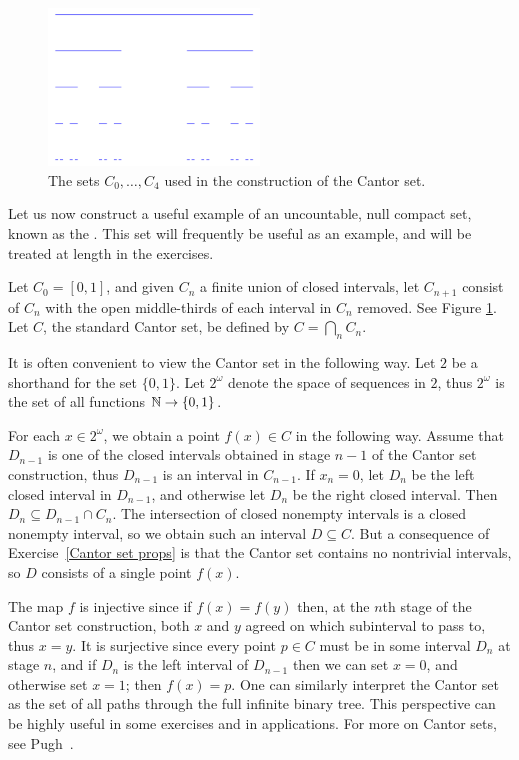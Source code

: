\begin{figure}
\label{Cantor set figure}
\caption{The sets $C_{0}, \dots, C_{4}$ used in the construction of the Cantor set.}
\centering \includegraphics[width=0.5\textwidth]{graphics/CantorSet}
\end{figure}

\begin{subsec}
Let us now construct a useful example of an uncountable, null compact set, known as the .
This set will frequently be useful as an example, and will be treated at length in the exercises.

Let $C_{0} = [0, 1]$, and given $C_{n}$ a finite union of closed intervals, let $C_{n+1}$ consist of $C_{n}$ with the open middle-thirds of each interval in $C_{n}$ removed.
See Figure \ref{Cantor set figure}.
Let $C$, the standard Cantor set, be defined by $C = \bigcap_{n} C_{n}$.
\end{subsec}

\begin{subsec}
It is often convenient to view the Cantor set in the following way. Let $2$ be a shorthand for the set $\{0, 1\}$.
Let $2^{\omega}$ denote the space of sequences in $2$, thus $2^{\omega}$ is the set of all functions $\mathbb{N} \to \{0, 1\}$.

For each $x \in 2^{\omega}$, we obtain a point $f(x) \in C$ in the following way.
Assume that $D_{n-1}$ is one of the closed intervals obtained in stage $n-1$ of the Cantor set construction, thus $D_{n-1}$ is an interval in $C_{n-1}$.
If $x_{n} = 0$, let $D_{n}$ be the left closed interval in $D_{n-1}$, and otherwise let $D_{n}$ be the right closed interval.
Then $D_{n} \subseteq D_{n-1} \cap C_{n}$.
The intersection of closed nonempty intervals is a closed nonempty interval, so we obtain such an interval $D \subseteq C$.
But a consequence of Exercise~\ref{Cantor set props} is that the Cantor set contains no nontrivial intervals, so $D$ consists of a single point $f(x)$.

The map $f$ is injective since if $f(x) = f(y)$ then, at the $n$th stage of the Cantor set construction, both $x$ and $y$ agreed on which subinterval to pass to, thus $x = y$.
It is surjective since every point $p \in C$ must be in some interval $D_{n}$ at stage $n$, and if $D_{n}$ is the left interval of $D_{n-1}$ then we can set $x = 0$, and otherwise set $x = 1$; then $f(x) = p$.
One can similarly interpret the Cantor set as the set of all paths through the full infinite binary tree.
This perspective can be highly useful in some exercises and in applications.
For more on Cantor sets, see Pugh~\cite[Chapter 2]{pugh2013real}.
\end{subsec}

